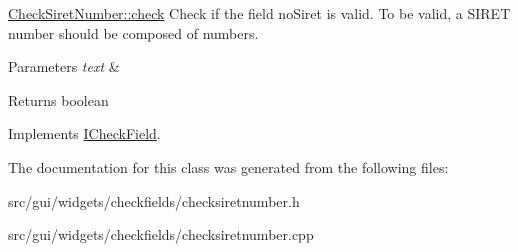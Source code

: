 \hyperlink{classCheckSiretNumber_aaf0a1411e380789062564bd992e72c1b}{Check\+Siret\+Number\+::check} Check if the field no\+Siret is valid. To be valid, a S\+I\+R\+E\+T number should be composed of numbers. 


\begin{DoxyParams}{Parameters}
{\em text} & \\
\hline
\end{DoxyParams}
\begin{DoxyReturn}{Returns}
boolean 
\end{DoxyReturn}


Implements \hyperlink{classICheckField_a6bd42b4d49c165cdd92822135123fd4b}{I\+Check\+Field}.



The documentation for this class was generated from the following files\+:\begin{DoxyCompactItemize}
\item 
src/gui/widgets/checkfields/checksiretnumber.\+h\item 
src/gui/widgets/checkfields/checksiretnumber.\+cpp\end{DoxyCompactItemize}
